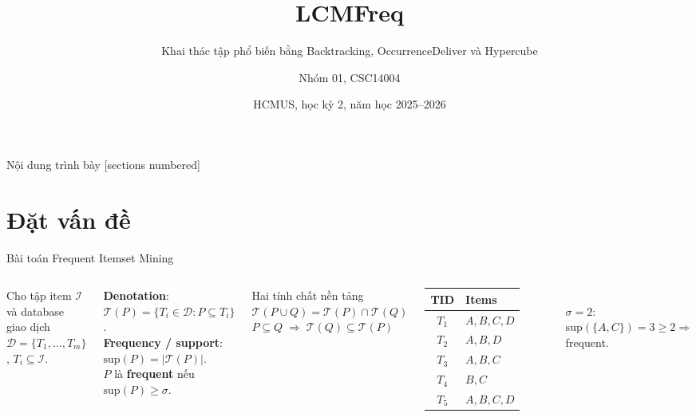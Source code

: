 \documentclass[9pt, aspectratio=169]{beamer}
\title{LCMFreq}
\subtitle{Khai thác tập phổ biến bằng Backtracking, OccurrenceDeliver và Hypercube}
\author{Nhóm 01, CSC14004}
\institute{Trường Đại học Khoa học Tự nhiên, ĐHQG-HCM}
\date{HCMUS, học kỳ 2, năm học 2025--2026}
\newcommand{\hl}[1]{\textcolor{accent}{\textbf{#1}}}
\begin{document}
\maketitle

\begin{frame}{Nội dung trình bày}
  [sections numbered]
  {\scriptsize\tableofcontents[hideallsubsections]}
\end{frame}

\section{Đặt vấn đề}

\begin{frame}{Bài toán Frequent Itemset Mining}
  \begin{columns}[T]
    Cho tập item $\mathcal I$ và database giao dịch
    $\mathcal D=\{T_1,\ldots,T_m\}$, $T_i\subseteq\mathcal I$.

    \vspace{0.3em}
    \textbf{Denotation}: $\mathcal T(P)=\{T_i\in\mathcal D : P\subseteq T_i\}$.\\
    \textbf{Frequency / support}: $\mathrm{sup}(P)=|\mathcal T(P)|$.\\
    $P$ là \hl{frequent} nếu $\mathrm{sup}(P)\geq\sigma$.

    \vspace{0.4em}
    \begin{block}{Hai tính chất nền tảng}
      \small
      $\mathcal T(P\cup Q)=\mathcal T(P)\cap\mathcal T(Q)$\\
      $P\subseteq Q \;\Rightarrow\; \mathcal T(Q)\subseteq\mathcal T(P)$
    \end{block}

    \centering
    \begin{tabular}{@{}cl@{}}
      \toprule
      TID & Items \\
      \midrule
      $T_1$ & $A,B,C,D$ \\
      $T_2$ & $A,B,D$ \\
      $T_3$ & $A,B,C$ \\
      $T_4$ & $B,C$ \\
      $T_5$ & $A,B,C,D$ \\
      \bottomrule
    \end{tabular}
    \vspace{0.3em}\\
    \footnotesize $\sigma=2$: $\mathrm{sup}(\{A,C\})=3\geq 2 \Rightarrow$ frequent.
  \end{columns}
\end{frame}
\end{document}
